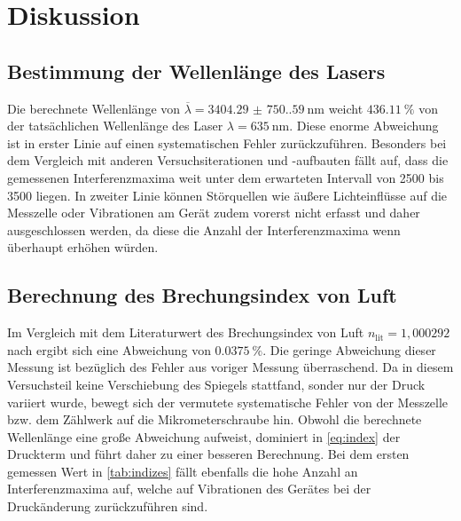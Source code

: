 \section{Diskussion}
\label{sec:Diskussion}

\subsection{Bestimmung der Wellenlänge des Lasers}

Die berechnete Wellenlänge von $\overline{\lambda} = \qty{3404.29(750.59)}{\nano\meter}$
weicht $\qty{436.11}{\percent}$ von der tatsächlichen Wellenlänge des Laser $\lambda = \qty{635}{\nano\meter}$.
Diese enorme Abweichung ist in erster Linie auf einen systematischen Fehler zurückzuführen.
Besonders bei dem Vergleich mit anderen Versuchsiterationen und -aufbauten fällt auf, 
dass die gemessenen Interferenzmaxima weit unter dem erwarteten Intervall von 2500 bis 3500 liegen.
In zweiter Linie können Störquellen wie äußere Lichteinflüsse auf die Messzelle oder Vibrationen am Gerät
zudem vorerst nicht erfasst und daher ausgeschlossen werden,
da diese die Anzahl der Interferenzmaxima wenn überhaupt erhöhen würden.


\subsection{Berechnung des Brechungsindex von Luft}

Im Vergleich mit dem Literaturwert des Brechungsindex von Luft $n_\text{lit} = 	1,000292$ nach \cite{brechungsindex}
ergibt sich eine Abweichung von $\qty{0.0375}{\percent}$. 
Die geringe Abweichung dieser Messung ist bezüglich des Fehler aus voriger Messung überraschend.
Da in diesem Versuchsteil keine Verschiebung des Spiegels stattfand, sonder nur der Druck variiert wurde,
bewegt sich der vermutete systematische Fehler von der Messzelle bzw. dem Zählwerk auf die Mikrometerschraube hin.
Obwohl die berechnete Wellenlänge eine große Abweichung aufweist, dominiert in \autoref{eq:index} der Druckterm
und führt daher zu einer besseren Berechnung. 
Bei dem ersten gemessen Wert in \autoref{tab:indizes} fällt ebenfalls die hohe Anzahl an Interferenzmaxima auf,
welche auf Vibrationen des Gerätes bei der Druckänderung zurückzuführen sind.